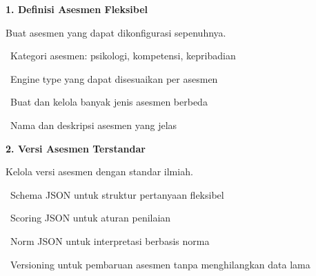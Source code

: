 \documentclass[a4paper]{article}
\begin{document}
\vspace{6pt}

\noindent
\begin{minipage}[t]{0.485\textwidth}
    \colorbox{FuchsiaPrimary}{%
        \begin{minipage}{\dimexpr\textwidth-2\fboxsep\relax}
            {\fontsize{10}{13}\selectfont\bfseries\color{White} 1. Definisi Asesmen Fleksibel}
        \end{minipage}}\par
    \vspace{4pt}
    {\fontsize{9}{12}\selectfont\color{TextDark}%
    Buat asesmen yang dapat dikonfigurasi sepenuhnya.\par\vspace{3pt}
    \textbullet\ Kategori asesmen: psikologi, kompetensi, kepribadian\par\vspace{2pt}%
    \textbullet\ Engine type yang dapat disesuaikan per asesmen\par\vspace{2pt}%
    \textbullet\ Buat dan kelola banyak jenis asesmen berbeda\par\vspace{2pt}%
    \textbullet\ Nama dan deskripsi asesmen yang jelas}%
\end{minipage}%
\hfill
\begin{minipage}[t]{0.485\textwidth}
    \colorbox{BluePrimary}{%
        \begin{minipage}{\dimexpr\textwidth-2\fboxsep\relax}
            {\fontsize{10}{13}\selectfont\bfseries\color{White} 2. Versi Asesmen Terstandar}
        \end{minipage}}\par
    \vspace{4pt}
    {\fontsize{9}{12}\selectfont\color{TextDark}%
    Kelola versi asesmen dengan standar ilmiah.\par\vspace{3pt}
    \textbullet\ Schema JSON untuk struktur pertanyaan fleksibel\par\vspace{2pt}%
    \textbullet\ Scoring JSON untuk aturan penilaian\par\vspace{2pt}%
    \textbullet\ Norm JSON untuk interpretasi berbasis norma\par\vspace{2pt}%
    \textbullet\ Versioning untuk pembaruan asesmen tanpa menghilangkan data lama}%
\end{minipage}
\end{document}
